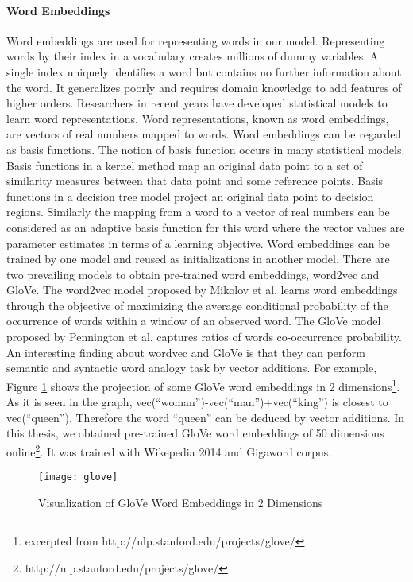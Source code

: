 \paragraph*{Word Embeddings} Word embeddings are used for representing words in our model. Representing words by their index in a vocabulary creates millions of dummy variables. A single index uniquely identifies a word but contains no further information about the word. It generalizes poorly and requires domain knowledge to add features of higher orders. Researchers in recent years have developed statistical models to learn word representations. Word representations, known as word embeddings, are vectors of real numbers mapped to words. Word embeddings can be regarded as basis functions. The notion of basis function occurs in many statistical models. Basis functions in a kernel method map an original data point to a set of similarity measures between that data point and some reference points. Basis functions in a decision tree model project an original data point to decision regions. Similarly the mapping from a word to a vector of real numbers can be considered as an adaptive basis function for this word where the vector values are parameter estimates in terms of a learning objective. Word embeddings can be trained by one model and reused as initializations in another model. There are two prevailing models to obtain pre-trained word embeddings, word2vec and GloVe. The word2vec model proposed by Mikolov et al. \cite{word2vec} learns word embeddings through the objective of maximizing the average conditional probability of the occurrence of words within a window of an observed word. The GloVe model proposed by Pennington et al. \cite{glove} captures ratios of words co-occurrence probability. An interesting finding about wordvec and GloVe is that they can perform semantic and syntactic word analogy task by vector additions. For example, Figure \ref{fig:glove} shows the projection of some GloVe word embeddings in 2 dimensions\footnote[2]{excerpted from http://nlp.stanford.edu/projects/glove/}. As it is seen in the graph, vec(``woman'')-vec(``man'')+vec(``king'') is closest to vec(``queen''). Therefore the word ``queen'' can be deduced by vector additions. In this thesis, we obtained pre-trained GloVe word embeddings of 50 dimensions online\footnote[3]{http://nlp.stanford.edu/projects/glove/}. It was trained with Wikepedia 2014 and Gigaword corpus.
\begin{figure}
  \centering
    \texttt{[image: glove]}
  \caption{Visualization of GloVe Word Embeddings in 2 Dimensions}
  \label{fig:glove}
\end{figure}

